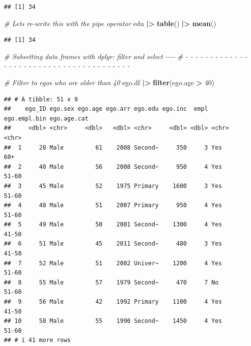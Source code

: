 \documentclass[
]{book}
\newenvironment{Shaded}{\begin{snugshade}}{\end{snugshade}}
\newcommand{\CommentTok}[1]{\textcolor[rgb]{0.56,0.35,0.01}{\textit{#1}}}
\newcommand{\DecValTok}[1]{\textcolor[rgb]{0.00,0.00,0.81}{#1}}
\newcommand{\FunctionTok}[1]{\textcolor[rgb]{0.13,0.29,0.53}{\textbf{#1}}}
\newcommand{\NormalTok}[1]{#1}
\newcommand{\SpecialCharTok}[1]{\textcolor[rgb]{0.81,0.36,0.00}{\textbf{#1}}}
\begin{document}
\begin{verbatim}
## [1] 34
\end{verbatim}

\begin{Shaded}
\begin{Highlighting}[]
\CommentTok{\# Let\textquotesingle{}s re{-}write this with the pipe operator}
\NormalTok{edu }\SpecialCharTok{|\textgreater{}} 
  \FunctionTok{table}\NormalTok{() }\SpecialCharTok{|\textgreater{}} 
  \FunctionTok{mean}\NormalTok{()}
\end{Highlighting}
\end{Shaded}

\begin{verbatim}
## [1] 34
\end{verbatim}

\begin{Shaded}
\begin{Highlighting}[]
\CommentTok{\# Subsetting data frames with dplyr: filter and select                      {-}{-}{-}{-}}
\CommentTok{\# {-} {-} {-} {-} {-} {-} {-} {-} {-} {-} {-} {-} {-} {-} {-} {-} {-} {-} {-} {-} {-} {-} {-} {-} {-} {-} {-} {-} {-} {-} {-} {-} {-} {-} {-} {-} {-} {-} {-} }

\CommentTok{\# Filter to egos who are older than 40}
\NormalTok{ego.df }\SpecialCharTok{|\textgreater{}} 
  \FunctionTok{filter}\NormalTok{(ego.age }\SpecialCharTok{\textgreater{}} \DecValTok{40}\NormalTok{)}
\end{Highlighting}
\end{Shaded}

\begin{verbatim}
## # A tibble: 51 x 9
##    ego_ID ego.sex ego.age ego.arr ego.edu ego.inc  empl ego.empl.bin ego.age.cat
##     <dbl> <chr>     <dbl>   <dbl> <chr>     <dbl> <dbl> <chr>        <chr>      
##  1     28 Male         61    2008 Second~     350     3 Yes          60+        
##  2     40 Male         56    2008 Second~     950     4 Yes          51-60      
##  3     45 Male         52    1975 Primary    1600     3 Yes          51-60      
##  4     48 Male         51    2007 Primary     950     4 Yes          51-60      
##  5     49 Male         50    2001 Second~    1300     4 Yes          41-50      
##  6     51 Male         45    2011 Second~     480     3 Yes          41-50      
##  7     52 Male         51    2002 Univer~    1200     4 Yes          51-60      
##  8     55 Male         57    1979 Second~     470     7 No           51-60      
##  9     56 Male         42    1992 Primary    1100     4 Yes          41-50      
## 10     58 Male         55    1990 Second~    1450     4 Yes          51-60      
## # i 41 more rows
\end{verbatim}
\end{document}
